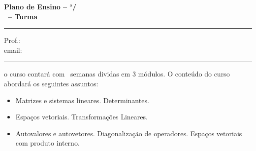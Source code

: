 \documentclass[12pt]{exam}
\begin{document}
\extraheadheight{0.7in}
\firstpageheadrule
\runningheadrule
{}

\extrafootheight{.5in}
\footrule
{}
\cfoot{}

\begin{center}
{\large\bf Plano de Ensino -- \semestre$^{o}$/\ano} \\
{\large\bf \disciplina\ -- Turma \turma}\\
\end{center}
\hrule

\begin{flushleft}
  Prof.: \nome\\
  email: \href{mailto:{\email}}{\email}
  \end{flushleft}
  \hrule
  \bigskip \bigskip
\vspace{0.25cm}
 o curso contar\'a com \numerosemanas\ semanas dividas em 3 m\'odulos. O conte\'udo do curso abordar\'a os seguintes assuntos:
\begin{itemize}
    \item Matrizes e sistemas lineares. Determinantes.

    \item Espa\c{c}os vetoriais. Transforma\c{c}\~oes Lineares.

    \item Autovalores e autovetores. Diagonaliza\c{c}\~ao de operadores. Espa\c{c}os vetoriais com produto interno.

\end{itemize}
\end{document}
